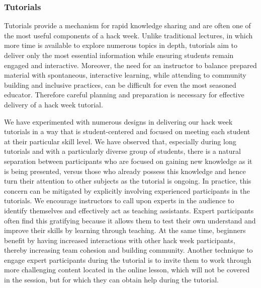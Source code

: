 \subsubsection{Tutorials}
Tutorials provide a mechanism for rapid knowledge sharing and are often one of the most useful components of a hack week. Unlike traditional lectures, in which more time is available to explore numerous topics in depth, tutorials aim to deliver only the most essential information while ensuring students remain engaged and interactive. Moreover, the need for an instructor to balance prepared material with spontaneous, interactive learning, while attending to community building and inclusive practices, can be difficult for even the most seasoned educator. Therefore careful planning and preparation is necessary for effective delivery of a hack week tutorial.

We have experimented with numerous designs in delivering our hack week tutorials in a way that is student-centered and focused on meeting each student at their particular skill level. We have observed that, especially during long tutorials and with a particularly diverse group of students, there is a natural separation between participants who are focused on gaining new knowledge as it is being presented, versus those who already possess this knowledge and hence turn their attention to other subjects as the tutorial is ongoing. In practice, this concern can be mitigated by explicitly involving experienced participants in the tutorials. We encourage instructors to call upon experts in the audience to identify themselves and effectively act as teaching assistants. Expert participants often find this gratifying because it allows them to test their own understand and improve their skills by learning through teaching. At the same time, beginners benefit by having increased interactions with other hack week participants, thereby increasing team cohesion and building community. Another technique to engage expert participants during the tutorial is to invite them to work through more challenging content located in the online lesson, which will not be covered in the session, but for which they can obtain help during the tutorial.

